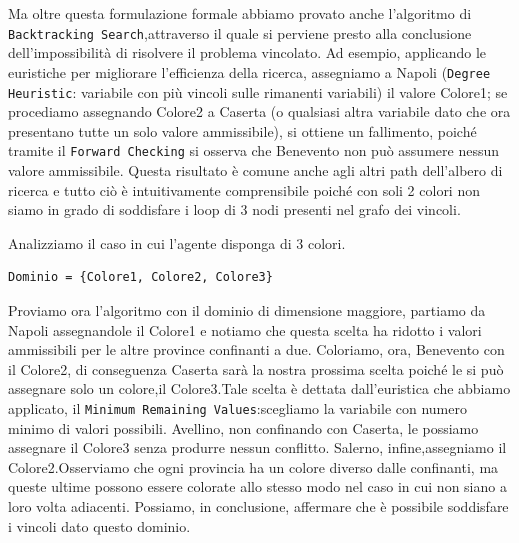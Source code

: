 		Ma oltre questa formulazione formale abbiamo provato anche l'algoritmo di \texttt{Backtracking Search},attraverso il quale si perviene presto alla conclusione dell'impossibilità di risolvere il problema vincolato. Ad esempio, applicando le euristiche per migliorare l'efficienza della ricerca, assegniamo a Napoli (\texttt{Degree Heuristic}: variabile con più vincoli sulle rimanenti variabili) il valore Colore1; se procediamo assegnando Colore2 a Caserta (o qualsiasi altra variabile dato che ora presentano tutte un solo valore ammissibile), si ottiene un fallimento, poiché tramite il \texttt{Forward Checking} si osserva che Benevento non può assumere nessun valore ammissibile. Questa risultato è comune anche agli altri path dell'albero di ricerca e tutto ciò è intuitivamente comprensibile poiché con soli 2 colori non siamo in grado di soddisfare i loop di 3 nodi presenti nel grafo dei vincoli.\par
		\bigskip
		Analizziamo il caso in cui l'agente disponga di 3 colori.
		\begin{lstlisting}
Dominio = {Colore1, Colore2, Colore3}
		\end{lstlisting}
		Proviamo ora l'algoritmo con il dominio di dimensione maggiore, partiamo da Napoli assegnandole il Colore1 e notiamo che questa scelta ha ridotto i valori ammissibili per le altre province confinanti a due. Coloriamo, ora, Benevento con il Colore2, di conseguenza Caserta sarà la nostra prossima scelta poiché le si può assegnare solo un colore,il Colore3.Tale scelta è dettata dall'euristica che abbiamo applicato, il \texttt{Minimum Remaining Values}:scegliamo la variabile con numero minimo di valori possibili. Avellino, non confinando con Caserta, le possiamo assegnare il Colore3 senza produrre nessun conflitto. Salerno, infine,assegniamo il Colore2.\newline Osserviamo che ogni provincia ha un colore diverso dalle confinanti, ma queste ultime  possono essere colorate allo stesso modo nel caso in cui non siano a loro volta adiacenti. Possiamo, in conclusione, affermare che è possibile soddisfare i vincoli dato questo dominio.
